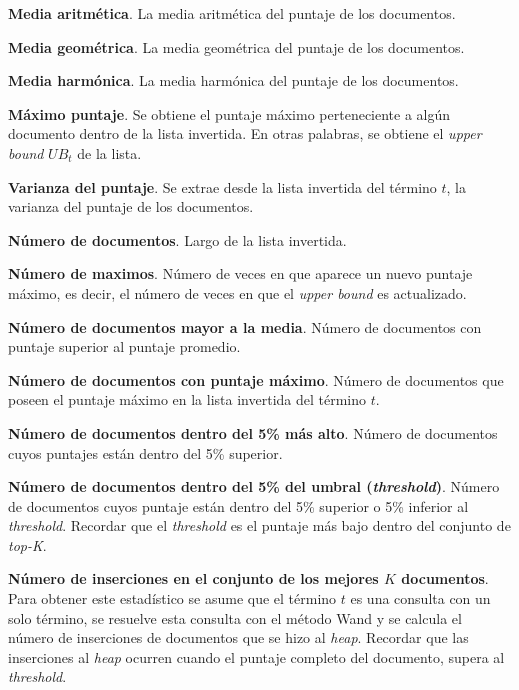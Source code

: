\begin{list}{}{}
	\item \textbf{Media aritmética}. La media aritmética del puntaje de los documentos.

	\item \textbf{Media geométrica}. La media geométrica del puntaje de los documentos.

	\item \textbf{Media harmónica}. La media harmónica del puntaje de los documentos. 

	\item \textbf{Máximo puntaje}. Se obtiene el puntaje máximo perteneciente a algún documento dentro de la lista invertida. En otras palabras, se obtiene el \textit{upper bound} $UB_t$ de la lista. 

	\item \textbf{Varianza del puntaje}. Se extrae desde la lista invertida del término $t$, la varianza del puntaje de los documentos. 
	
	\item \textbf{Número de documentos}. Largo de la lista invertida. 

	\item \textbf{Número de maximos}. Número de veces en que aparece un nuevo puntaje máximo, es decir, el número de veces en que el \textit{upper bound} es actualizado. 

	\item \textbf{Número de documentos mayor a la media}. Número de documentos con puntaje superior al puntaje promedio. 
	
	\item \textbf{Número de documentos con puntaje máximo}. Número de documentos que poseen el puntaje máximo en la lista invertida del término $t$. 
	
	\item \textbf{Número de documentos dentro del 5\% más alto}. Número de documentos cuyos puntajes están dentro del 5\% superior. 
	
	\item \textbf{Número de documentos dentro del 5\% del umbral (\textit{threshold})}. Número de documentos cuyos puntaje están dentro del 5\% superior o 5\% inferior al \textit{threshold}. Recordar que el \textit{threshold} es el puntaje más bajo dentro del conjunto de \textit{top-K}.
	
	\item \textbf{Número de inserciones en el conjunto de los mejores $K$ documentos}. Para obtener este estadístico se asume que el término $t$ es una consulta con un solo término, se resuelve esta consulta con el método Wand y se calcula el número de inserciones de documentos que se hizo al \textit{heap}. Recordar que las inserciones al \textit{heap} ocurren cuando el puntaje completo del documento, supera al \textit{threshold}.
	

\end{list}
